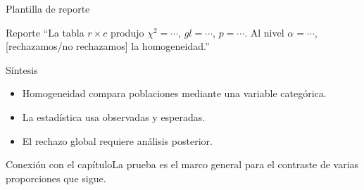 \documentclass[10pt,aspectratio=169]{beamer}
\begin{document}
\begin{frame}{Plantilla de reporte}\small\begin{block}{Reporte} ``La tabla $r\times c$ produjo $\chi^2=\cdots$, $gl=\cdots$, $p=\cdots$. Al nivel $\alpha=\cdots$, [rechazamos/no rechazamos] la homogeneidad.''\end{block}\end{frame}
\begin{frame}{Síntesis}\small\begin{itemize}\item Homogeneidad compara poblaciones mediante una variable categórica.\item La estadística usa observadas y esperadas.\item El rechazo global requiere análisis posterior.\end{itemize}\end{frame}
\begin{frame}{Conexión con el capítulo}\small La prueba es el marco general para el contraste de varias proporciones que sigue.\end{frame}
\end{document}
